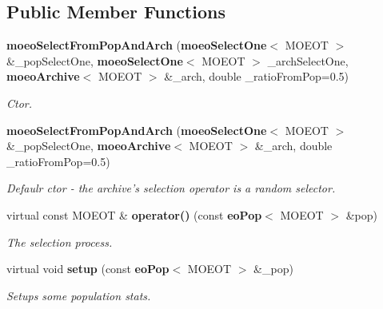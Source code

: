 \subsection*{Public Member Functions}
\begin{CompactItemize}
\item 
{\bf moeo\-Select\-From\-Pop\-And\-Arch} ({\bf moeo\-Select\-One}$<$ MOEOT $>$ \&\_\-pop\-Select\-One, {\bf moeo\-Select\-One}$<$ MOEOT $>$ \_\-arch\-Select\-One, {\bf moeo\-Archive}$<$ MOEOT $>$ \&\_\-arch, double \_\-ratio\-From\-Pop=0.5)
\begin{CompactList}\small\item\em Ctor. \item\end{CompactList}\item 
{\bf moeo\-Select\-From\-Pop\-And\-Arch} ({\bf moeo\-Select\-One}$<$ MOEOT $>$ \&\_\-pop\-Select\-One, {\bf moeo\-Archive}$<$ MOEOT $>$ \&\_\-arch, double \_\-ratio\-From\-Pop=0.5)
\begin{CompactList}\small\item\em Defaulr ctor - the archive's selection operator is a random selector. \item\end{CompactList}\item 
virtual const MOEOT \& {\bf operator()} (const {\bf eo\-Pop}$<$ MOEOT $>$ \&pop)\label{classmoeoSelectFromPopAndArch_7b763aef8e25f205159b69b3f746c942}

\begin{CompactList}\small\item\em The selection process. \item\end{CompactList}\item 
virtual void {\bf setup} (const {\bf eo\-Pop}$<$ MOEOT $>$ \&\_\-pop)\label{classmoeoSelectFromPopAndArch_70180aeaa5d647a720276c82b7a0b111}

\begin{CompactList}\small\item\em Setups some population stats. \item\end{CompactList}\end{CompactItemize}
